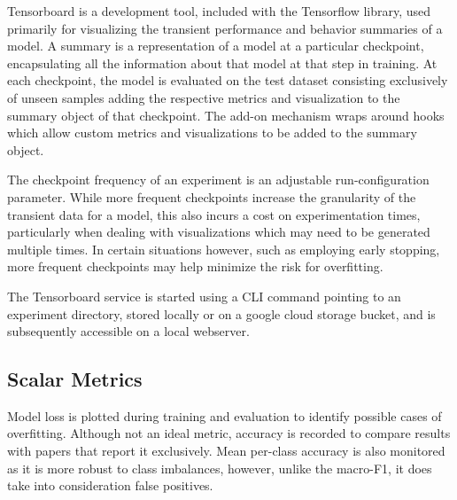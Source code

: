 \documentclass[../../fyp.tex]{subfiles}
\begin{document}
Tensorboard is a development tool, included with the Tensorflow library, used primarily for visualizing the transient performance and behavior summaries of a model. A summary is a representation of a model at a particular checkpoint, encapsulating all the information about that model at that step in training. At each checkpoint, the model is evaluated on the test dataset consisting exclusively of unseen samples adding the respective metrics and visualization to the summary object of that checkpoint. The add-on mechanism wraps around hooks which allow custom metrics and visualizations to be added to the summary object.

 The checkpoint frequency of an experiment is an adjustable run-configuration parameter. While more frequent checkpoints increase the granularity of the transient data for a model, this also incurs a cost on experimentation times, particularly when dealing with visualizations which may need to be generated multiple times. In certain situations however, such as employing early stopping, more frequent checkpoints may help minimize the risk for overfitting.

The Tensorboard service is started using a CLI command pointing to an experiment directory, stored locally or on a google cloud storage bucket, and is subsequently accessible on a local webserver.   

\subsection{Scalar Metrics}
Model loss is plotted during training and evaluation to identify possible cases of overfitting. Although not an ideal metric, accuracy is recorded to compare results with papers that report it exclusively. Mean per-class accuracy is also monitored as it is more robust to class imbalances, however, unlike the macro-F1, it does take into consideration false positives. 
\end{document}

